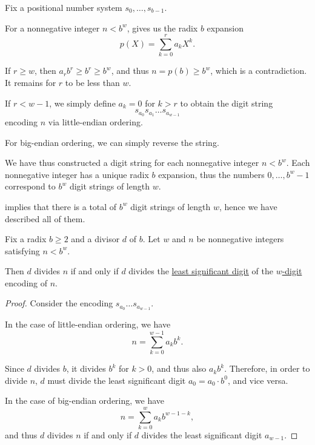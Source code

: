 \begin{defproof}
  Fix a positional number system \( s_0, \ldots, s_{b-1} \).

  For a nonnegative integer \( n < b^w \),  gives us the radix \( b \) expansion
  \begin{equation*}
    p(X) = \sum_{k=0}^r a_k X^k.
  \end{equation*}

  If \( r \geq w \), then \( a_r b^r \geq b^r \geq b^w \), and thus \( n = p(b) \geq b^w \), which is a contradiction. It remains for \( r \) to be less than \( w \).

  If \( r < w - 1 \), we simply define \( a_k = 0 \) for \( k > r \) to obtain the digit string
  \begin{equation*}
    s_{a_0} s_{a_1} \ldots s_{a_{w-1}}
  \end{equation*}
  encoding \( n \) via little-endian ordering.

  For big-endian ordering, we can simply reverse the string.

  We have thus constructed a digit string for each nonnegative integer \( n < b^w \). Each nonnegative integer has a unique radix \( b \) expansion, thus the numbers \( 0, \ldots, b^w - 1 \) correspond to \( b^w \) digit strings of length \( w \).

   implies that there is a total of \( b^w \) digit strings of length \( w \), hence we have described all of them.
\end{defproof}

\begin{proposition}\label{thm:nonnegative_integer_expansion_divisibility}
  Fix a radix \( b \geq 2 \) and a divisor \( d \) of \( b \). Let \( w \) and \( n \) be nonnegative integers satisfying \( n < b^w \).

  Then \( d \) divides \( n \) if and only if \( d \) divides the \hyperref[def:endianness]{least significant digit} of the \hyperref[def:ring_of_unsigned_integers]{\( w \)-digit} encoding of \( n \).
\end{proposition}
\begin{proof}
  Consider the encoding \( s_{a_0} \ldots s_{a_{w-1}} \).

  In the case of little-endian ordering, we have
  \begin{equation*}
    n = \sum_{k=0}^{w-1} a_k b^k.
  \end{equation*}

  Since \( d \) divides \( b \), it divides \( b^k \) for \( k > 0 \), and thus also \( a_k b^k \). Therefore, in order to divide \( n \), \( d \) must divide the least significant digit \( a_0 = a_0 \cdot b^0 \), and vice versa.

  In the case of big-endian ordering, we have
  \begin{equation*}
    n = \sum_{k=0}^w a_k b^{w-1-k},
  \end{equation*}
  and thus \( d \) divides \( n \) if and only if \( d \) divides the least significant digit \( a_{w-1} \).
\end{proof}

